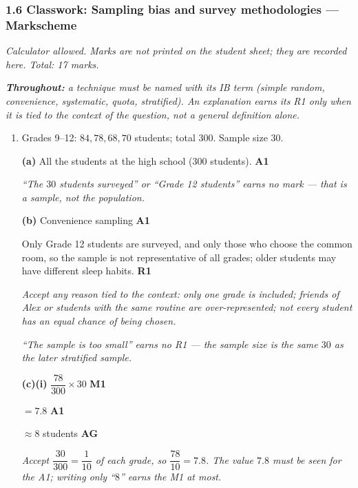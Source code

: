 \documentclass[12pt, twoside]{article}
\begin{document}
\subsubsection*{1.6 Classwork: Sampling bias and survey methodologies --- Markscheme}

\emph{Calculator allowed. Marks are not printed on the student sheet; they are
recorded here. Total: 17 marks.}

\emph{\textbf{Throughout:} a technique must be named with its IB term (simple
random, convenience, systematic, quota, stratified). An explanation earns its
R1 only when it is tied to the context of the question, not a general
definition alone.}

\begin{enumerate}[itemsep=0.3cm]

\item[1.] [Maximum mark: 8]

Grades 9--12: $84, 78, 68, 70$ students; total $300$. Sample size $30$.

\textbf{(a)} All the students at the high school ($300$ students).
\hfill \textbf{A1}

\emph{``The $30$ students surveyed'' or ``Grade 12 students'' earns no
mark --- that is a sample, not the population.}

\textbf{(b)} Convenience sampling \hfill \textbf{A1}

Only Grade 12 students are surveyed, and only those who choose the common
room, so the sample is not representative of all grades; older students
may have different sleep habits. \hfill \textbf{R1}

\emph{Accept any reason tied to the context: only one grade is included;
friends of Alex or students with the same routine are over-represented;
not every student has an equal chance of being chosen.}

\emph{``The sample is too small'' earns no R1 --- the sample size is the
same $30$ as the later stratified sample.}

\textbf{(c)(i)} $\dfrac{78}{300} \times 30$ \hfill \textbf{M1}

$= 7.8$ \hfill \textbf{A1}

$\approx 8$ students \hfill \textbf{AG}

\emph{Accept $\dfrac{30}{300} = \dfrac{1}{10}$ of each grade, so
$\dfrac{78}{10} = 7.8$. The value $7.8$ must be seen for the A1; writing
only ``$8$'' earns the M1 at most.}


\end{enumerate}
\end{document}
